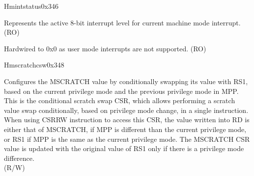 \begin{register}{H}{mintstatus}{0x346}
\label{regdesc:MINTSTATUS}
%
%
%
\regnewline%
\begin{regdesc}\begin{reglist}
\label{fielddesc:MINTSTATUS_MIL}\item [MIL] Represents the active 8-bit interrupt level for current machine mode interrupt. (RO)
\label{fielddesc:MINTSTATUS_UIL}\item [UIL] Hardwired to 0x0 as user mode interrupts are not supported. (RO)
\end{reglist}\end{regdesc}
\end{register}


\begin{register}{H}{mscratchcsw}{0x348}\label{regdesc:MSCRATCHCSW_REG}
%
\regnewline%
\begin{regdesc}\begin{reglist}
\label{fielddesc:MSCRATCHCSW}\item [MSCRATCHCSW] Configures the MSCRATCH value by conditionally swapping its value with RS1, based on the current privilege mode and the previous privilege mode in MPP.\\
This is the conditional scratch swap CSR, which allows performing a scratch value swap conditionally, based on privilege mode change, in a single instruction.\\
When using CSRRW instruction to access this CSR, the value written into RD is either that of MSCRATCH, if MPP is different than the current privilege mode, or RS1 if MPP is the same as the current privilege mode. The MSCRATCH CSR value is updated with the original value of RS1 only if there is a privilege mode difference. \\
(R/W)
\end{reglist}\end{regdesc}
\end{register}

